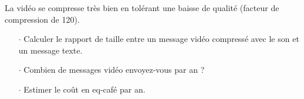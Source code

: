 La vidéo se compresse très bien en tolérant une baisse de qualité  (facteur de compression de 120).

\begin{itemize}
\item[$\cdot$] Calculer le rapport de taille entre un message vidéo compressé avec le son et un message texte.
\item[$\cdot$] Combien de messages vidéo envoyez-vous par an ?
\item[$\cdot$] Estimer le coût en eq-café par an.
\end{itemize}

